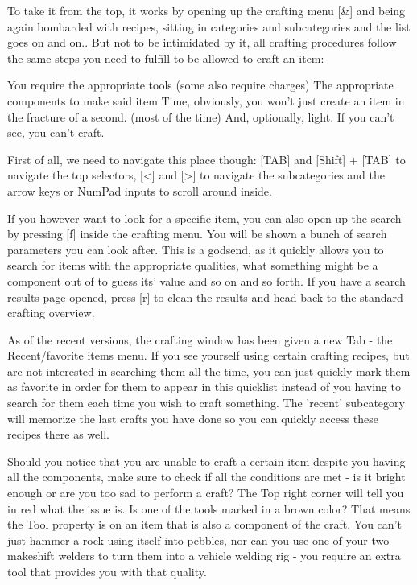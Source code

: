 \documentclass[11pt]{report}
\begin{document}
To take it from the top, it works by opening up the crafting menu [\&] and being again bombarded with recipes, sitting in categories and subcategories and the list goes on and on.. But not to be intimidated by it, all crafting procedures follow the same steps you need to fulfill to be allowed to craft an item:

You require the appropriate tools (some also require charges)
The appropriate components to make said item
Time, obviously, you won't just create an item in the fracture of a second. (most of the time)
And, optionally, light. If you can't see, you can't craft.

First of all, we need to navigate this place though: [TAB] and [Shift] + [TAB] to navigate the top selectors, [<] and [>] to navigate the subcategories and the arrow keys or NumPad inputs to scroll around inside.

If you however want to look for a specific item, you can also open up the search by pressing [f] inside the crafting menu. You will be shown a bunch of search parameters you can look after. This is a godsend, as it quickly allows you to search for items with the appropriate qualities, what something might be a component out of to guess its' value and so on and so forth. If you have a search results page opened, press [r] to clean the results and head back to the standard crafting overview.

As of the recent versions, the crafting window has been given a new Tab - the Recent/favorite items menu. If you see yourself using certain crafting recipes, but are not interested in searching them all the time, you can just quickly mark them as favorite in order for them to appear in this quicklist instead of you having to search for them each time you wish to craft something. The 'recent' subcategory will memorize the last crafts you have done so you can quickly access these recipes there as well.

Should you notice that you are unable to craft a certain item despite you having all the components, make sure to check if all the conditions are met - is it bright enough or are you too sad to perform a craft? The Top right corner will tell you in red what the issue is. Is one of the tools marked in a brown color? That means the Tool property is on an item that is also a component of the craft. You can't just hammer a rock using itself into pebbles, nor can you use one of your two makeshift welders to turn them into a vehicle welding rig - you require an extra tool that provides you with that quality.
\end{document}
